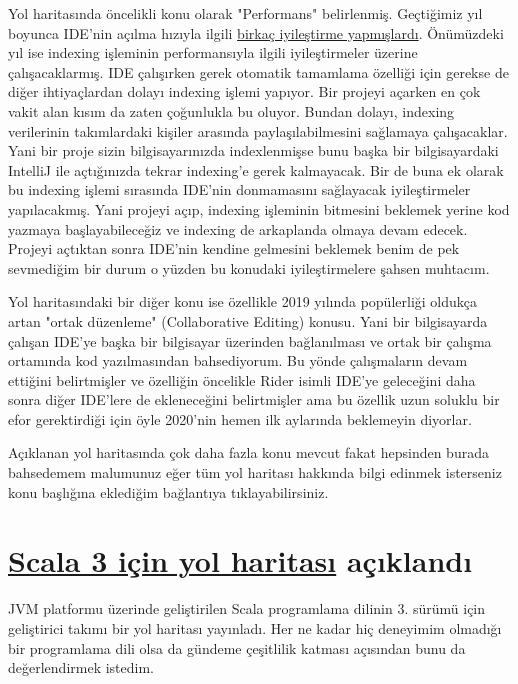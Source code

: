 \documentclass[11pt]{article}
\begin{document}
Yol haritasında öncelikli konu olarak "Performans" belirlenmiş. Geçtiğimiz yıl
boyunca IDE'nin açılma hızıyla ilgili \href{https://blog.jetbrains.com/idea/2019/10/preview-the-performance-improvements-in-intellij-idea-2019-3/}{birkaç iyileştirme yapmışlardı}.
Önümüzdeki yıl ise indexing işleminin performansıyla ilgili iyileştirmeler
üzerine çalışacaklarmış. IDE çalışırken gerek otomatik tamamlama özelliği için
gerekse de diğer ihtiyaçlardan dolayı indexing işlemi yapıyor. Bir projeyi
açarken en çok vakit alan kısım da zaten çoğunlukla bu oluyor. Bundan dolayı,
indexing verilerinin takımlardaki kişiler arasında paylaşılabilmesini sağlamaya
çalışacaklar. Yani bir proje sizin bilgisayarınızda indexlenmişse bunu başka
bir bilgisayardaki IntelliJ ile açtığınızda tekrar indexing'e gerek kalmayacak.
Bir de buna ek olarak bu indexing işlemi sırasında IDE'nin donmamasını
sağlayacak iyileştirmeler yapılacakmış. Yani projeyi açıp, indexing işleminin
bitmesini beklemek yerine kod yazmaya başlayabileceğiz ve indexing de
arkaplanda olmaya devam edecek. Projeyi açtıktan sonra IDE'nin kendine
gelmesini beklemek benim de pek sevmediğim bir durum o yüzden bu konudaki
iyileştirmelere şahsen muhtacım.

Yol haritasındaki bir diğer konu ise özellikle 2019 yılında popülerliği oldukça
artan "ortak düzenleme" (Collaborative Editing) konusu. Yani bir bilgisayarda
çalışan IDE'ye başka bir bilgisayar üzerinden bağlanılması ve ortak bir çalışma
ortamında kod yazılmasından bahsediyorum. Bu yönde çalışmaların devam ettiğini
belirtmişler ve özelliğin öncelikle Rider isimli IDE'ye geleceğini daha sonra
diğer IDE'lere de ekleneceğini belirtmişler ama bu özellik uzun soluklu bir
efor gerektirdiği için öyle 2020'nin hemen ilk aylarında beklemeyin diyorlar.

Açıklanan yol haritasında çok daha fazla konu mevcut fakat hepsinden burada
bahsedemem malumunuz eğer tüm yol haritası hakkında bilgi edinmek isterseniz
konu başlığına eklediğim bağlantıya tıklayabilirsiniz.
\section{\href{https://www.scala-lang.org/2019/12/18/road-to-scala-3.html}{Scala 3 için yol haritası} açıklandı}
\label{sec:orgb630e3c}
JVM platformu üzerinde geliştirilen Scala programlama dilinin 3. sürümü için
geliştirici takımı bir yol haritası yayınladı. Her ne kadar hiç deneyimim
olmadığı bir programlama dili olsa da gündeme çeşitlilik katması açısından bunu
da değerlendirmek istedim.
\end{document}
